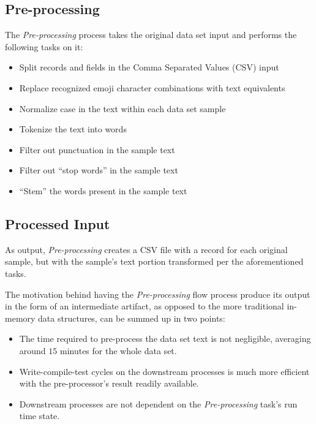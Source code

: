 \documentclass[conference]{sig-alternate-05-2015}
\begin{document}
\subsection{Pre-processing}\label{subsec:preprocessing}
The \textit{Pre-processing} process takes the original data set input and
performs the following tasks on it:

\begin{itemize}
  \item Split records and fields in the Comma Separated Values (CSV) input
  \item Replace recognized emoji character combinations with text equivalents
  \item Normalize case in the text within each data set sample
  \item Tokenize the text into words
  \item Filter out punctuation in the sample text
  \item Filter out ``stop words'' in the sample text
  \item ``Stem'' the words present in the sample text
\end{itemize}

\subsection{Processed Input}\label{subsec:processed_input}
As output, \textit{Pre-processing} creates a CSV file with a record for each
original sample, but with the sample's text portion transformed per the
aforementioned tasks.

The motivation behind having the \textit{Pre-processing} flow process produce
its output in the form of an intermediate artifact, as opposed to the more
traditional in-memory data structures, can be summed up in two points:
\begin{itemize}
  \item The time required to pre-process the data set text is not negligible,
  averaging around $15$ minutes for the whole data set.
  \item Write-compile-test cycles on the downstream processes is much more
  efficient with the pre-processor's result readily available.
  \item Downstream processes are not dependent on the \textit{Pre-processing}
  task's run time state.
\end{itemize}
\end{document}
